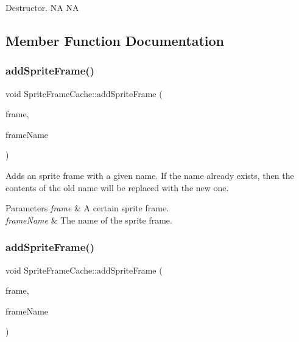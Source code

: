 Destructor.  NA  NA 

\subsection{Member Function Documentation}
\mbox{\label{classSpriteFrameCache_ae4f777955e41dd502fff0f85370c730c}} 
\subsubsection{\texorpdfstring{add\+Sprite\+Frame()}{addSpriteFrame()}\hspace{0.1cm}{\footnotesize\ttfamily [1/2]}}
{\footnotesize\ttfamily void Sprite\+Frame\+Cache\+::add\+Sprite\+Frame (\begin{DoxyParamCaption}\item[{\hyperlink{classSpriteFrame}{Sprite\+Frame} $\ast$}]{frame,  }\item[{const std\+::string \&}]{frame\+Name }\end{DoxyParamCaption})}

Adds an sprite frame with a given name. If the name already exists, then the contents of the old name will be replaced with the new one.


\begin{DoxyParams}{Parameters}
{\em frame} & A certain sprite frame. \\
\hline
{\em frame\+Name} & The name of the sprite frame. \\
\hline
\end{DoxyParams}
\mbox{\label{classSpriteFrameCache_ae4f777955e41dd502fff0f85370c730c}} 
\subsubsection{\texorpdfstring{add\+Sprite\+Frame()}{addSpriteFrame()}\hspace{0.1cm}{\footnotesize\ttfamily [2/2]}}
{\footnotesize\ttfamily void Sprite\+Frame\+Cache\+::add\+Sprite\+Frame (\begin{DoxyParamCaption}\item[{\hyperlink{classSpriteFrame}{Sprite\+Frame} $\ast$}]{frame,  }\item[{const std\+::string \&}]{frame\+Name }\end{DoxyParamCaption})}

